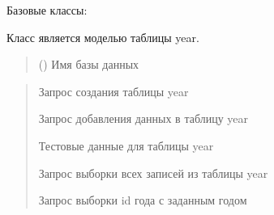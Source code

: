 \documentclass[letterpaper,10pt,russian]{sphinxmanual}
\begin{document}
\begin{fulllineitems}
\label{\detokenize{database.sqlite3_interface.tables:database.sqlite3_interface.tables.year.Year}}
\pysigstartsignatures
{}
\pysigstopsignatures
\sphinxAtStartPar
Базовые классы: {\hyperref[\detokenize{database.sqlite3_interface.tables:database.sqlite3_interface.tables.table.Table}]{}}

\sphinxAtStartPar
Класс является моделью таблицы year.
\begin{quote}\begin{description}
\sphinxAtStartPar
{} () \textendash{} Имя базы данных

\end{description}\end{quote}
\begin{description}
\begin{quote}\begin{description}
\sphinxAtStartPar
Запрос создания таблицы year

\sphinxAtStartPar
Запрос добавления данных в таблицу year

\sphinxAtStartPar
Тестовые данные для таблицы year

\sphinxAtStartPar
Запрос выборки всех записей из таблицы year

\sphinxAtStartPar
Запрос выборки id года с заданным годом

\end{description}\end{quote}

\begin{sphinxVerbatim}[commandchars=\\\{\}]
\end{sphinxVerbatim}


\end{description}
\end{fulllineitems}
\end{document}

